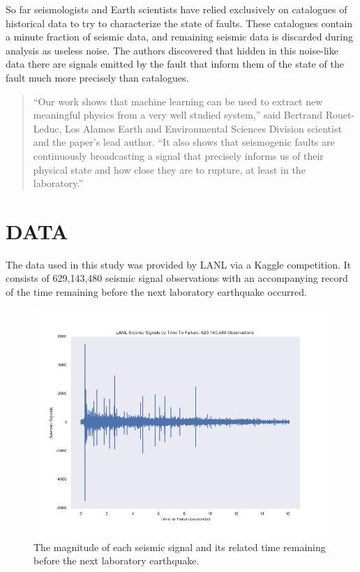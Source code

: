 \documentclass[]{llncs}
\begin{document}
So far seismologists and Earth scientists have relied exclusively on catalogues of historical data to try to characterize the state of faults. These catalogues contain a minute fraction of seismic data, and remaining seismic data is discarded during analysis as useless noise. The authors discovered that hidden in this noise-like data there are signals emitted by the fault that inform them of the state of the fault much more precisely than catalogues.\cite{LANLNews}\par
\begin{quote}
“Our work shows that machine learning can be used to extract new meaningful physics from a very well studied system,” said Bertrand Rouet-Leduc, Los Alamos Earth and Environmental Sciences Division scientist and the paper’s lead author. “It also shows that seismogenic faults are continuously broadcasting a signal that precisely informs us of their physical state and how close they are to rupture, at least in the laboratory.”
\end{quote}

\section{DATA} The data used in this study was provided by LANL via a Kaggle competition\cite{kaggle}. It consists of 629,143,480 seismic signal observations with an accompanying record of the time remaining before the next laboratory earthquake occurred.\par
\begin{figure}[h]
	\centering
	\includegraphics[width=0.7\linewidth]{../GPUProject/allDataDefaultPlot}
	\caption{The magnitude of each seismic signal and its related time remaining before the next laboratory earthquake.}
	\label{fig:alldatadefaultplot}
\end{figure}
\end{document}
